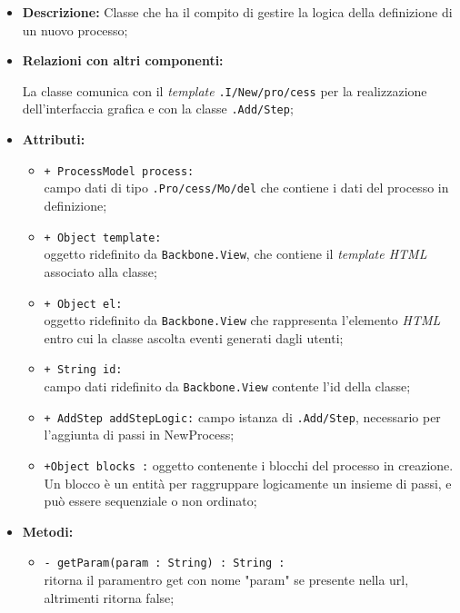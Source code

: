 \begin{flushleft}
\begin{itemize}
\item \textbf{Descrizione:} Classe che ha il compito di gestire la logica della definizione di un nuovo processo;
\item \textbf{Relazioni con altri componenti:}
\begin{sloppypar}
La classe comunica con il \textit{template} \texttt{\viewAdmin{}.I\fshyp{}New\fshyp{}pro\fshyp{}cess} per la realizzazione dell'interfaccia grafica e con la classe \texttt{\logicAdmin{}.Add\fshyp{}Step};
\end{sloppypar}
\item \textbf{Attributi:}
\begin{sloppypar}
\begin{itemize}
\item \texttt{+ ProcessModel process:}\\ campo dati di tipo \texttt{\model{}.Pro\fshyp{}cess\fshyp{}Mo\fshyp{}del} che contiene i dati del processo in definizione;
\item \texttt{+ Object template:}\\ oggetto ridefinito da \texttt{Backbone.View}, che contiene il \textit{template HTML} associato alla classe;
\item \texttt{+ Object el:}\\ oggetto ridefinito da \texttt{Backbone.View} che rappresenta l'elemento \textit{HTML} entro cui la classe ascolta eventi generati dagli utenti;
\item \texttt{+ String id:}\\ campo dati ridefinito da \texttt{Backbone.View} contente l'id della classe;
\item \texttt{+ AddStep addStepLogic:} campo istanza di \texttt{\logicAdmin{}.Add\fshyp{}Step}, necessario per l'aggiunta di passi in NewProcess;
\item \texttt{+Object blocks :} oggetto contenente i blocchi del processo in creazione. Un blocco è un entità per raggruppare logicamente un insieme di passi, e può essere sequenziale o non ordinato;    
\end{itemize}
\end{sloppypar}
\item \textbf{Metodi:}
\begin{sloppypar}
\begin{itemize}
\item \texttt{- getParam(param : String) : String :}\\ ritorna il paramentro get con nome "param" se presente nella url, altrimenti ritorna false;

\end{itemize}
\end{sloppypar}
\end{itemize}
\end{flushleft}
